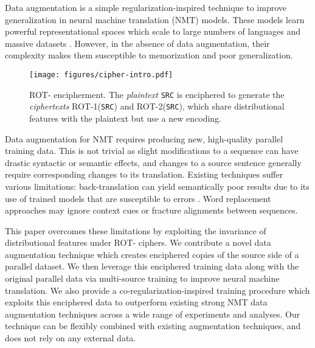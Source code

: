 \documentclass[11pt]{article}
\begin{document}
Data augmentation is a simple regularization-inspired technique to improve generalization in neural machine translation (NMT) models.
These models \cite{bahdanau2015attn, vaswani2017attention} learn powerful representational spaces \cite{raganato2018analysis, voita2019analyzing, kudugunta2019investigating} which scale to large numbers of languages and massive datasets \cite{aharoni-etal-2019-massively}. 
However, in the absence of data augmentation, their complexity makes them susceptible to memorization and poor generalization.

\begin{figure}
    \centering
    \texttt{[image: figures/cipher-intro.pdf]}
    \caption{ROT- encipherment. 
The \emph{plaintext} \texttt{SRC} is enciphered to generate the \emph{ciphertexts} ROT-1(\texttt{SRC}) and ROT-2(\texttt{SRC}), which share distributional features with the plaintext but use a new encoding.}
    \label{fig:rotk}
\end{figure}

Data augmentation for NMT requires producing new, high-quality parallel training data.
This is not trivial as slight modifications to a sequence can have drastic syntactic or semantic effects, and changes to a source sentence generally require corresponding changes to its translation.
Existing techniques suffer various limitations:
back-translation \cite{sennrich2016improving, edunov2018understanding, xia2019generalized, nguyen19datadiverse}
can yield semantically poor results due to its use of trained models that are susceptible to errors \cite{edunov2018understanding}.
Word replacement approaches \cite{gao-etal-2019-soft, liu-etal-2021-counterfactual, takase-kiyono-2021-rethinking, belinkov2018synthetic, sennrich-etal-2016-edinburgh, guo-etal-2020-sequence, wu-etal-2021-mixseq}
may ignore context cues or fracture alignments between 
sequences. 

This paper overcomes these limitations by 
exploiting the invariance of 
distributional features under ROT- ciphers. 
We contribute a novel data augmentation technique 
which creates enciphered copies of the source side of a parallel dataset. 
We then leverage this enciphered training data along with the original parallel data via multi-source training to improve neural machine translation. 
We also provide a co-regularization-inspired training procedure which exploits this enciphered data to outperform existing strong NMT data augmentation techniques across a wide range of experiments and analyses. Our technique can be flexibly combined with existing augmentation techniques, and does not rely on any external data. 
\end{document}
